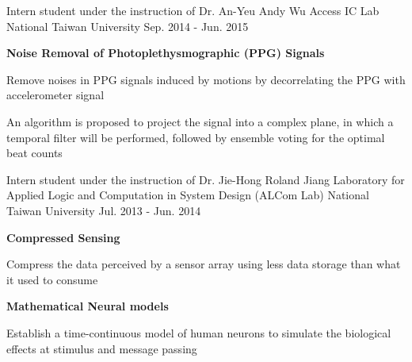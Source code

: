 \documentclass[12pt, a4paper]{awesome-cv}
\begin{document}
\begin{cventries}
    \cventry
    {Intern student under the instruction of Dr. An-Yeu Andy Wu}
    {Access IC Lab}
    {National Taiwan University}
    {Sep. 2014 - Jun. 2015}
    {
        \begin{cvitems}
        \item{\bfseries Noise Removal of Photoplethysmographic (PPG) Signals}
            \begin{cvitems}
            \item{Remove noises in PPG signals induced by motions by decorrelating the PPG with accelerometer signal}
            \item{An algorithm is proposed to project the signal into a complex plane, in which a temporal filter will be performed, followed by ensemble voting for the optimal beat counts}
            \end{cvitems}
        \end{cvitems}
    }
    \vspace{-5mm}

    \cventry
    {Intern student under the instruction of Dr. Jie-Hong Roland Jiang}
    {Laboratory for Applied Logic and Computation in System Design (ALCom Lab)}
    {National Taiwan University}
    {Jul. 2013 - Jun. 2014}
    {
        \begin{cvitems}
        \item{\bfseries Compressed Sensing}
            \begin{cvitems}
            \item{Compress the data perceived by a sensor array using less data storage than what it used to consume}
            \end{cvitems}
        \item{\bfseries Mathematical Neural models}
            \begin{cvitems}
            \item{Establish a time-continuous model of human neurons to simulate the biological effects at stimulus and message passing}
            \end{cvitems}
        \end{cvitems}
    }
\end{cventries}
\vspace{-5mm}
\end{document}
